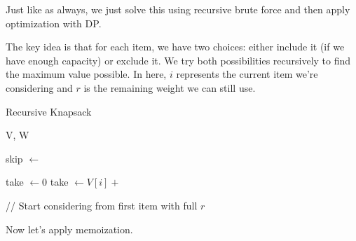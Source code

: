   Just like as always, we just solve this using recursive brute force and then apply optimization with DP. 

  \begin{algo}
    The key idea is that for each item, we have two choices: either include it (if we have enough capacity) or exclude it. We try both possibilities recursively to find the maximum value possible. In here, $i$ represents the current item we're considering and $r$ is the remaining weight we can still use. 
    \begin{algorithm}[H]
      \caption{Recursive Knapsack}
      \label{alg:recknapG}
      \begin{algorithmic}
        \State V, W
            
            \State {}   
          \EndIf {}

          \State skip $\gets$   

          \State take $\gets 0$  
            
            \State take $\gets V[i] +$  
          \EndIf {}

          \State {} 
        \EndFunction
        
        \State // Start considering from first item with full $r$ 
        \State {}
      \end{algorithmic}
    \end{algorithm}
  \end{algo}

  Now let's apply memoization. 

